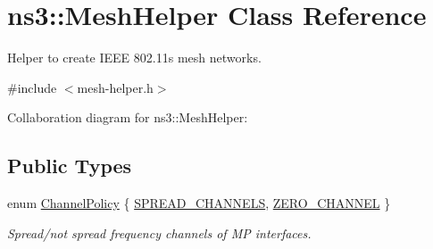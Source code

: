 \hypertarget{classns3_1_1MeshHelper}{}\section{ns3\+:\+:Mesh\+Helper Class Reference}
\label{classns3_1_1MeshHelper}


Helper to create I\+E\+EE 802.\+11s mesh networks.  




{\ttfamily \#include $<$mesh-\/helper.\+h$>$}



Collaboration diagram for ns3\+:\+:Mesh\+Helper\+:
\subsection*{Public Types}
\begin{DoxyCompactItemize}
\item 
enum \hyperlink{classns3_1_1MeshHelper_ac0e3f8f6ae16a79bb09cc25e5c7b8301}{Channel\+Policy} \{ \hyperlink{classns3_1_1MeshHelper_ac0e3f8f6ae16a79bb09cc25e5c7b8301a1519e687a721a277fe0859621129103b}{S\+P\+R\+E\+A\+D\+\_\+\+C\+H\+A\+N\+N\+E\+LS}, 
\hyperlink{classns3_1_1MeshHelper_ac0e3f8f6ae16a79bb09cc25e5c7b8301adba490debb025aecf7c894990267c544}{Z\+E\+R\+O\+\_\+\+C\+H\+A\+N\+N\+EL}
 \}\begin{DoxyCompactList}\small\item\em Spread/not spread frequency channels of MP interfaces. \end{DoxyCompactList}
\end{DoxyCompactItemize}
